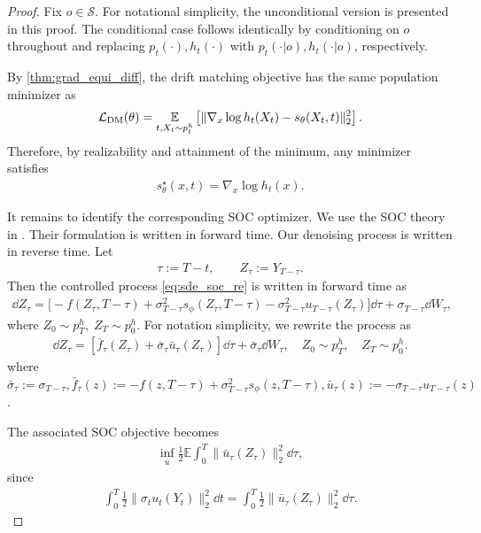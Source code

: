 \begin{proof}
Fix $o \in\mathcal S$. For notational simplicity, the unconditional version is presented in this proof.
The conditional case follows identically by conditioning on $o$ throughout and replacing $p_t(\cdot),h_t(\cdot)$ with $p_t(\cdot|o),h_t(\cdot|o)$, respectively.

By \cref{thm:grad_equi_diff}, the drift matching objective has the same population minimizer as
\begin{align*}
    \mathcal{L}_{\mathrm{DM}}(\theta)
    =
    \operatorname*{{\mathbb{E}}}_{t,X_t\sim p_t^h}
    \left[
        \|
        \nabla_x\log h_t(X_t)-s_\theta(X_t,t)
        \|_2^2
    \right].
\end{align*}
Therefore, by realizability and attainment of the minimum, any minimizer satisfies
\begin{align*}
    s_\theta^\star(x,t)
    =
    \nabla_x\log h_t(x).
\end{align*}

It remains to identify the corresponding SOC optimizer.
We use the SOC theory in \cite{liu2025adjoint}.
Their formulation is written in forward time.
Our denoising process is written in reverse time.
Let
\begin{align*}
    \tau:=T-t,\qquad Z_\tau:=Y_{T-\tau}.
\end{align*}
Then the controlled process \eqref{eq:sde_soc_re} is written in forward time as
\begin{align*}
    \dd Z_\tau
    =
    \bigl[
        -f(Z_\tau,T-\tau)
        +
        \sigma_{T-\tau}^2s_\phi(Z_\tau,T-\tau)
        -
        \sigma_{T-\tau}^2u_{T-\tau}(Z_\tau)
    \bigr]\dd \tau
    +
    \sigma_{T-\tau}\dd W_\tau,
\end{align*}
where $Z_0\sim p_T^h,\; Z_T\sim p_0^h$.
For notation simplicity, we rewrite the process as
\begin{align*}
    \dd Z_\tau
    =
    [
        \bar f_\tau(Z_\tau)
        +
        \bar\sigma_\tau \bar u_\tau(Z_\tau)
    ]\dd \tau
    +
    \bar\sigma_\tau\dd W_\tau,
    \quad
    Z_0\sim p_T^h,\quad Z_T\sim p_0^h.
\end{align*}
where
$\bar\sigma_\tau :=
\sigma_{T-\tau},
\bar f_\tau(z)
:=
-f(z,T-\tau)
+
\sigma_{T-\tau}^2s_\phi(z,T-\tau),
\bar u_\tau(z)
:=
-\sigma_{T-\tau}u_{T-\tau}(z)$.

The associated SOC objective becomes
\begin{align*}
    \inf_{\bar u}
    \frac12
    \mathbb E
    \int_0^T
    \|
    \bar u_\tau(Z_\tau)
    \|_2^2\dd \tau,
\end{align*}
since
\begin{align*}
    \int_0^T
    \frac12
    \|
    \sigma_tu_t(Y_t)
    \|_2^2\dd t
    =
    \int_0^T
    \frac12
    \|
    \bar u_\tau(Z_\tau)
    \|_2^2\dd \tau.
\end{align*}


\end{proof}
